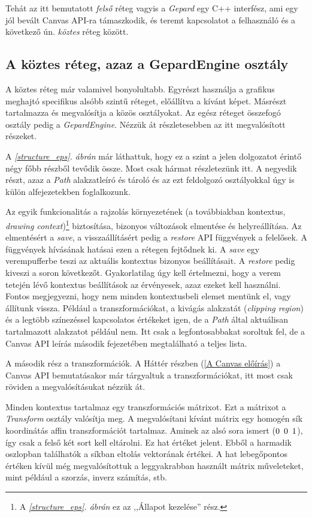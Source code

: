 \documentclass[12pt]{report}
\theoremstyle{definition}
\newcommand{\inenglish}[1]{\textsl{#1}}
\newcommand{\func}[1]{{\textsl{#1}}}
\begin{document}
Tehát az itt bemutatott \emph{felső} réteg vagyis a \func{Gepard} egy C++
interfész, ami egy jól bevált Canvas API-ra támaszkodik, és teremt kapcsolatot
a felhasználó és a következő ún. \emph{köztes} réteg között.

    \subsection*{A köztes réteg, azaz a GepardEngine osztály}

A köztes réteg már valamivel bonyolultabb. Egyrészt használja a grafikus
meghajtó specifikus alsóbb szintű réteget, előállítva a kívánt képet. Másrészt
tartalmazza és megvalósítja a közös osztályokat. Az egész réteget összefogó
osztály pedig a \func{GepardEngine}. Nézzük át részletesebben az itt
megvalósított részeket.

A \emph{\ref{structure_eps}. ábrán} már láthattuk, hogy ez a szint a jelen
dolgozatot érintő négy főbb részből tevődik össze. Most csak hármat
részletezünk itt. A negyedik részt, azaz a \emph{Path} alakzatleíró és tároló
és az ezt feldolgozó osztályokkal úgy is külön alfejezetekben foglalkozunk.

Az egyik funkcionalitás a rajzolás környezetének (a továbbiakban kontextus,
\inenglish{drawing context})\footnote{A \emph{\ref{structure_eps}. ábrán} ez az
,,Állapot kezelése'' rész.} biztosítása, bizonyos változások elmentése és
helyreállítása. Az elmentésért a \func{save}, a visszaállításért pedig a
\func{restore} API függvények a felelősek. A függvények hívásának hatásai ezen
a rétegen fejtődnek ki. A \func{save} egy verempufferbe teszi az aktuális
kontextus bizonyos beállításait. A \func{restore} pedig kiveszi a soron
következőt. Gyakorlatilag úgy kell értelmezni, hogy a verem tetején lévő
kontextus beállítások az érvényesek, azaz ezeket kell használni. Fontos
megjegyezni, hogy nem minden kontextusbeli elemet mentünk el, vagy állítunk
vissza. Például a transzformációkat, a kivágás alakzatát (\inenglish{clipping
region}) és a legtöbb színezéssel kapcsolatos értékeket igen, de a \emph{Path}
által aktuálisan tartalmazott alakzatot például nem. Itt csak a
legfontosabbakat soroltuk fel, de a Canvas API leírás \cite{Cabanier:14:HCC}
második fejezetében megtalálható a teljes lista.

A második rész a transzformációk. A Háttér részben (\ref{A Canvas előírás}) a
Canvas API bemutatásakor már tárgyaltuk a transzformációkat, itt most csak
röviden a megvalósításukat nézzük át.

Minden kontextus tartalmaz egy transzformációs mátrixot. Ezt a mátrixot a
\func{Transform} osztály valósítja meg. A megvalósítani kívánt mátrix egy
homogén sík koordinátás affin transzformációt tartalmaz. Aminek az alsó sora
ismert ($0\enskip 0\enskip 1$), így csak a felső két sort kell eltárolni. Ez
hat értéket jelent. Ebből a harmadik oszlopban találhatók a síkban eltolás
vektorának értékei. A hat lebegőpontos értéken kívül még megvalósítottuk a
leggyakrabban használt mátrix műveleteket, mint például a szorzás, inverz
számítás, stb.
\end{document}
